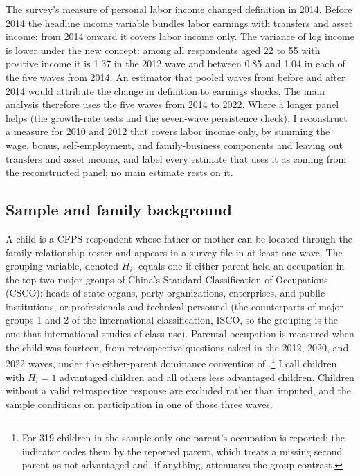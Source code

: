 \documentclass[11pt]{article}
\begin{document}
The survey's measure of personal labor income changed definition in 2014.
Before 2014 the headline income variable bundles labor earnings with
transfers and asset income; from 2014 onward it covers labor income only. The
variance of log income is lower under the new concept: among all respondents aged 22 to 55 with positive income it is 1.37 in the 2012 wave and between 0.85 and 1.04 in each of the five waves from 2014. An estimator that pooled waves from before and after 2014 would attribute the change in definition to earnings
shocks. The main analysis
therefore uses the five waves from 2014 to 2022. Where a longer panel
helps (the growth-rate tests and the seven-wave persistence check), I reconstruct a measure for 2010 and 2012 that covers labor income
only, by summing the wage, bonus, self-employment, and family-business
components and leaving out transfers and asset income, and label every
estimate that uses it as coming from the
reconstructed panel; no main estimate rests on it.

\subsection{Sample and family background}
\label{sec:sample}

A child is a CFPS respondent whose father or mother can be located through the family-relationship roster and appears in a survey file in at least one wave. The grouping variable, denoted $H_i$, equals one if either parent held
an occupation in the top two major groups of China's Standard
Classification of Occupations (CSCO): heads of state organs, party
organizations, enterprises, and public institutions, or professionals and technical personnel (the counterparts of
major groups 1 and 2 of the international classification, ISCO, so the
grouping is the one that international studies of class use). Parental occupation is measured when the child was fourteen, from
retrospective questions asked in the 2012, 2020, and 2022 waves, under
the either-parent dominance convention of
\citet{EriksonGoldthorpe1992}.\footnote{For
319 children in the sample only one parent's occupation is reported; the indicator
codes them by the reported parent, which treats a missing second
parent as not advantaged and, if anything, attenuates the group
contrast.} I call children with $H_i = 1$
advantaged children and all others less advantaged children. Children
without a valid retrospective response are excluded rather than
imputed, and the sample conditions on participation in one of those
three waves.
\end{document}
